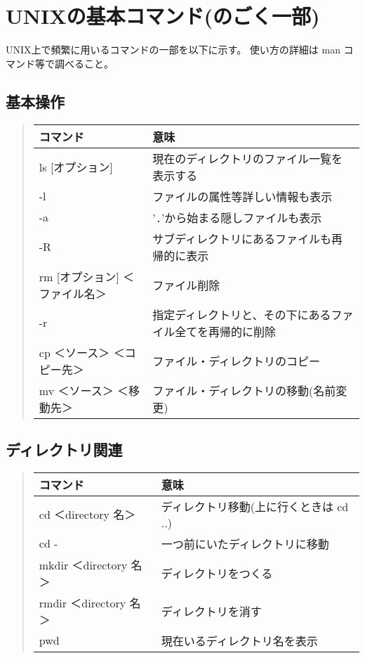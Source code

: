 \documentclass{jreport}
\begin{document}
\section{UNIXの基本コマンド(のごく一部)}

UNIX上で頻繁に用いるコマンドの一部を以下に示す。
使い方の詳細は man コマンド等で調べること。

\subsection{基本操作}

\begin{quote}
\begin{tabular}[t]{ll}\hline
コマンド & 意味 \\ \hline
ls [オプション]& 現在のディレクトリのファイル一覧を表示する \\
\qquad -l & ファイルの属性等詳しい情報も表示\\
\qquad -a & '\verb|.|'から始まる隠しファイルも表示\\
\qquad -R & サブディレクトリにあるファイルも再帰的に表示\\
rm [オプション] ＜ファイル名＞ & ファイル削除 \\
\qquad -r & 指定ディレクトリと、その下にあるファイル全てを再帰的に削除\\
\small{cp ＜ソース＞ ＜コピー先＞} & 
ファイル・ディレクトリのコピー\\
\small{mv ＜ソース＞ ＜移動先＞} & 
ファイル・ディレクトリの移動(名前変更)\\
\hline
\end{tabular}
\end{quote}


\subsection{ディレクトリ関連}

\begin{quote}
\begin{tabular}[t]{ll}\hline
コマンド & 意味 \\ \hline
cd ＜directory 名＞ & ディレクトリ移動(上に行くときは cd ..) \\
cd - & 一つ前にいたディレクトリに移動 \\
mkdir ＜directory 名＞ & ディレクトリをつくる \\
rmdir ＜directory 名＞ & ディレクトリを消す \\
pwd & 現在いるディレクトリ名を表示\\
\hline
\end{tabular}
\end{quote}
\end{document}
